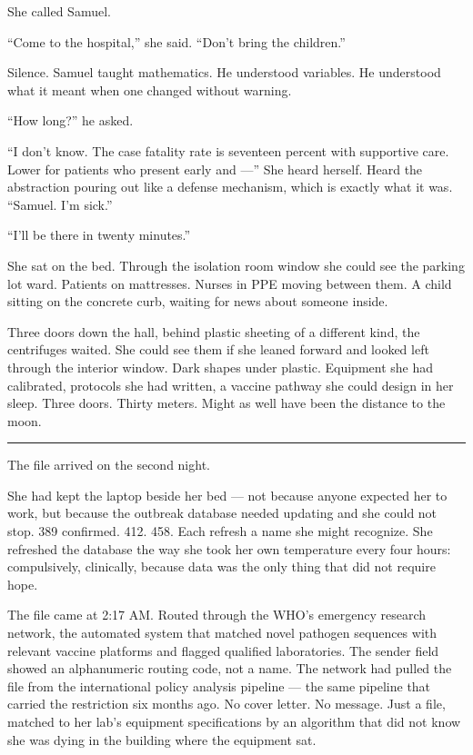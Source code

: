 \documentclass[11pt]{article}
\begin{document}
She called Samuel.

``Come to the hospital,'' she said. ``Don't bring the children.''

Silence. Samuel taught mathematics. He understood variables. He understood what it meant when one changed without warning.

``How long?'' he asked.

``I don't know. The case fatality rate is seventeen percent with supportive care. Lower for patients who present early and ---'' She heard herself. Heard the abstraction pouring out like a defense mechanism, which is exactly what it was. ``Samuel. I'm sick.''

``I'll be there in twenty minutes.''

She sat on the bed. Through the isolation room window she could see the parking lot ward. Patients on mattresses. Nurses in PPE moving between them. A child sitting on the concrete curb, waiting for news about someone inside.

Three doors down the hall, behind plastic sheeting of a different kind, the centrifuges waited. She could see them if she leaned forward and looked left through the interior window. Dark shapes under plastic. Equipment she had calibrated, protocols she had written, a vaccine pathway she could design in her sleep. Three doors. Thirty meters. Might as well have been the distance to the moon.

\begin{center}\rule{0.3\linewidth}{0.4pt}\end{center}

The file arrived on the second night.

She had kept the laptop beside her bed --- not because anyone expected her to work, but because the outbreak database needed updating and she could not stop. 389 confirmed. 412. 458. Each refresh a name she might recognize. She refreshed the database the way she took her own temperature every four hours: compulsively, clinically, because data was the only thing that did not require hope.

The file came at 2:17 AM. Routed through the WHO's emergency research network, the automated system that matched novel pathogen sequences with relevant vaccine platforms and flagged qualified laboratories. The sender field showed an alphanumeric routing code, not a name. The network had pulled the file from the international policy analysis pipeline --- the same pipeline that carried the restriction six months ago. No cover letter. No message. Just a file, matched to her lab's equipment specifications by an algorithm that did not know she was dying in the building where the equipment sat.
\end{document}

